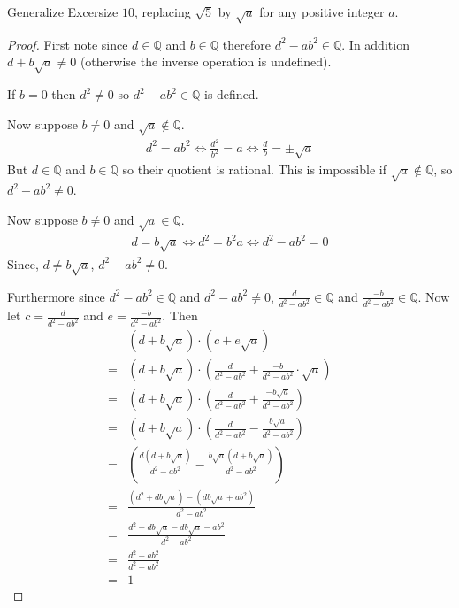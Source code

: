 \documentclass[6pt]{article}
\begin{document}
\begin{tcolorbox}[title=Problem 11, breakable]
    Generalize Excersize $10$, replacing $\sqrt{5}$ by $\sqrt{a}$ for any positive integer $a$.
\end{tcolorbox}

\begin{proof}
    First note since $d \in \mathbb{Q}$ and $b \in \mathbb{Q}$ therefore $d^2 - ab^2 \in \mathbb{Q}$.
    In addition $d + b\sqrt{a} \not = 0$ (otherwise the inverse operation is undefined).

    If $b = 0$ then $d^2 \not = 0$ so $d^2 - ab^2 \in \mathbb{Q}$ is defined.

    Now suppose $b \not = 0$ and $\sqrt{a} \not \in \mathbb{Q}$.
    \begin{align*}
        d^2 = ab^2 \iff \frac{d^2}{b^2} = a \iff \frac{d}{b} = \pm \sqrt{a}
    \end{align*}
    But $d \in \mathbb{Q}$ and $b \in \mathbb{Q}$ so their quotient is rational.
    This is impossible if $\sqrt{a} \notin \mathbb{Q}$, so $d^2 - ab^2 \neq 0$.

    Now suppose $b \not = 0$ and $\sqrt{a} \in \mathbb{Q}$.
    \begin{align*}
        d = b\sqrt{a} \iff d^2 = b^2 a \iff d^2 - ab^2 = 0
    \end{align*}
    Since, $d \not = b\sqrt{a}$, $d^2 - ab^2 \not = 0$.

    Furthermore since $d^2 - ab^2 \in \mathbb{Q}$ and $d^2 - ab^2 \not = 0$,
        $\frac{d}{d^2 - ab^2} \in \mathbb{Q}$ and $\frac{-b}{d^2 - ab^2} \in \mathbb{Q}$.
    Now let $c = \frac{d}{d^2 - ab^2}$ and $e = \frac{-b}{d^2 - ab^2}$.
    Then
    \begin{align*}
        & (d + b\sqrt{a}) \cdot (c + e\sqrt{a}) && \\
        = &(d + b\sqrt{a}) \cdot \left(\frac{d}{d^2 - ab^2} + \frac{-b}{d^2 - ab^2} \cdot \sqrt{a}\right) && \\
        = &(d + b\sqrt{a}) \cdot \left(\frac{d}{d^2 - ab^2} + \frac{-b\sqrt{a}}{d^2 - ab^2}\right) && \\
        = &(d + b\sqrt{a}) \cdot \left(\frac{d}{d^2 - ab^2} - \frac{b\sqrt{a}}{d^2 - ab^2}\right) && \\
        = &\left(\frac{d(d + b\sqrt{a})}{d^2 - ab^2} - \frac{b\sqrt{a}(d + b\sqrt{a})}{d^2 - ab^2}\right) && \\
        = &\frac{(d^2 + db\sqrt{a}) - (db\sqrt{a} + ab^2)}{d^2 - ab^2} && \\
        = &\frac{d^2 + db\sqrt{a} - db\sqrt{a} - ab^2}{d^2 - ab^2} && \\
        = &\frac{d^2 - ab^2}{d^2 - ab^2} && \\
        = &1
    \end{align*}
\end{proof}
\end{document}
